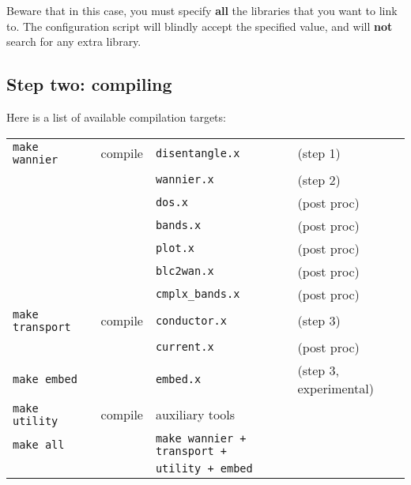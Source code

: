 \noindent Beware that in this case, you must specify \textbf{all} the
libraries that you want to link to.  The configuration script will
blindly accept the specified value, and will \textbf{not} search for any
extra library.\\


\newpage
\subsection{Step two: compiling}
\noindent Here is a list of available compilation targets: \\

%
%
\begin{tabular}{llll}
  \texttt{make wannier}    &  compile & \texttt{disentangle.x} &(step 1)\\
  \texttt{}                &          & \texttt{wannier.x}     &(step 2)\\
  \texttt{}                &          & \texttt{dos.x}         &(post proc)\\
  \texttt{}                &          & \texttt{bands.x}       &(post proc)\\
  \texttt{}                &          & \texttt{plot.x}        &(post proc)\\
  \texttt{}                &          & \texttt{blc2wan.x}     &(post proc)\\
  \texttt{}                &          & \texttt{cmplx\_bands.x} &(post proc)\\
  \texttt{make transport}  &  compile & \texttt{conductor.x}   &(step 3)\\
  \texttt{}                &          & \texttt{current.x}     &(post proc)\\
  \texttt{make embed}      &          & \texttt{embed.x}       &(step 3, experimental)\\
  \texttt{make utility}    &  compile & auxiliary tools        &\\
  \texttt{make all}        &          & \texttt{make wannier + transport +} & \\
                           &          & \texttt{utility + embed} & \\
\end{tabular} 
\\[15pt]
